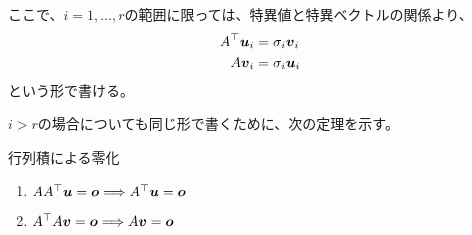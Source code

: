\documentclass[../../../topic_linear-algebra]{subfiles}
\begin{document}
\br

ここで、$i = 1,\ldots,r$の範囲に限っては、特異値と特異ベクトルの関係より、
\begin{align*}
  A^\top \vb*{u}_i & = \sigma_i \vb*{v}_i \\
  A\vb*{v}_i       & = \sigma_i \vb*{u}_i
\end{align*}
という形で書ける。

$i >r$の場合についても同じ形で書くために、次の定理を示す。

\begin{theorem*}{行列積による零化}
  \begin{enumerate}[label=\romanlabel]
    \item $AA^\top \vb*{u} = \vb*{o} \Longrightarrow A^\top \vb*{u} = \vb*{o}$
    \item $A^\top A \vb*{v} = \vb*{o} \Longrightarrow A\vb*{v} = \vb*{o}$
  \end{enumerate}
\end{theorem*}
\end{document}

